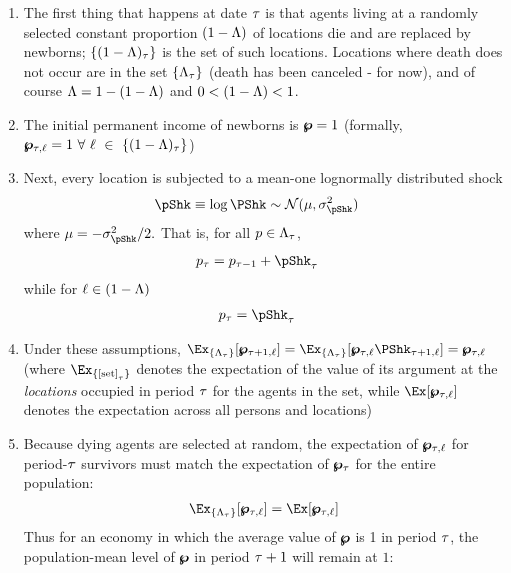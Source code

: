 \documentclass[../BufferStockTheory.tex]{subfiles}\usepackage{ApndxSteadyState}
\begin{document}
  \begin{enumerate}
  \item The first thing that happens at date $\tAbs$ is that agents living at a randomly selected constant proportion $\Die$ of locations die and are replaced by newborns; $\{\Die_{\tAbs}\}$ is the set of such locations.  Locations where death does not occur are in the set  $\{\Liv_{\tAbs}\}$ (death has been canceled - for now), and of course $\Liv=1-\Die$ and $0 < \Die < 1$.

  \item The initial permanent income of newborns is  $\pLev=1$ (formally, $\pLev_{\tAbs,\posn} = 1~\forall~\posn~\in~\{\Die_{\tAbs}\}$)
  \item Next, every location is subjected to a mean-one lognormally distributed shock
    \begin{align}
      \pShk & \equiv \log \PShk \sim \mathcal{N}(\pShkMean,\sigma^{2}_{\pShk}) \label{eq:pShkDef}
    \end{align}
    where $\pShkMean = -\sigma^{2}_{\pShk}/2.$  That is, for all $\pLog \in \Liv_{\tAbs}$, 
    \begin{align}
      \pLog_{\tAbs} & = \pLog_{\tAbs-1}+\pShk_{\tAbs} \label{eq:pRandomwalk}
    \end{align}
    while for $\posn \in \Die$
    \begin{align}
      \pLog_{\tAbs} & = \pShk_{\tAbs} \label{eq:pStartsAtZero}
    \end{align}
    
  \item Under these assumptions, $\Ex_{\{\Liv_{\tAbs}\}}[\pLev_{\tAbs+1,\posn}]=\Ex_{\{\Liv_{\tAbs}\}}[\pLev_{\tAbs,\posn}\PShk_{\tAbs+1,\posn}]=\pLev_{\tAbs,\posn}$ (where $\Ex_{\{\text{[set]}_{\tAbs}\}}$ denotes the expectation of the value of its argument at the \emph{locations} occupied in period $\tAbs$ for the agents in the set, while  $\Ex[\pLev_{\tAbs,\posn}]$ denotes the expectation across all persons and locations)      
  \item Because dying agents are selected at random, the expectation of $\pLev_{\tAbs,\posn}$ for period-$\tAbs$ survivors must match the expectation of $\pLev_{\tAbs}$ for the entire population:
    \begin{align}
      \Ex_{\{\Liv_{\tAbs}\}}[\pLev_{\tAbs,\posn}]=\Ex[\pLev_{\tAbs,\posn}] \label{eq:pLevLivIsOne}
    \end{align}
    Thus for an economy in which the average value of $\pLev$ is 1 in period $\tAbs$, the population-mean level of $\pLev$ in period $\tAbs+1$ will remain at $1$:
  \end{enumerate}
\end{document}
